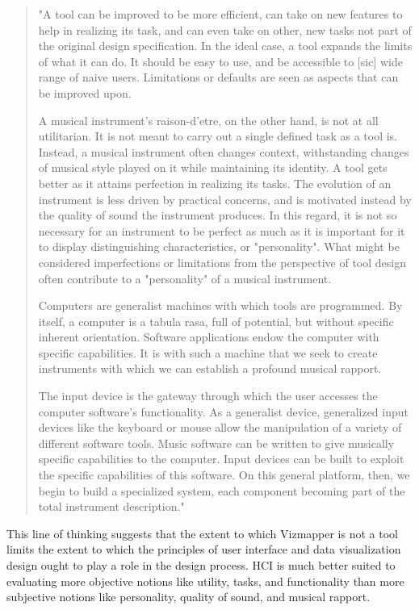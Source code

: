 \begin{quote}
"A tool can be improved to be more efficient, can take on new features to help in realizing its task, and can even take on other, new tasks not part of the original design specification. In the ideal case, a tool expands the limits of what it can do. It should be easy to use, and be accessible to [sic] wide range of naive users. Limitations or defaults are seen as aspects that can be improved upon.

A musical instrument's raison-d'etre, on the other hand, is not at all utilitarian. It is not meant to carry out a single defined task as a tool is. Instead, a musical instrument often changes context, withstanding changes of musical style played on it while maintaining its identity. A tool gets better as it attains perfection in realizing its tasks. The evolution of an instrument is less driven by practical concerns, and is motivated instead by the quality of sound the instrument produces. In this regard, it is not so necessary for an instrument to be perfect as much as it is important for it to display distinguishing characteristics, or "personality". What might be considered imperfections or limitations from the perspective of tool design often contribute to a "personality" of a musical instrument.

Computers are generalist machines with which tools are programmed. By itself, a computer is a tabula rasa, full of potential, but without specific inherent orientation. Software applications endow the computer with specific capabilities. It is with such a machine that we seek to create instruments with which we can establish a profound musical rapport.

The input device is the gateway through which the user accesses the computer software's functionality. As a generalist device, generalized input devices like the keyboard or mouse allow the manipulation of a variety of different software tools. Music software can be written to give musically specific capabilities to the computer. Input devices can be built to exploit the specific capabilities of this software. On this general platform, then, we begin to build a specialized system, each component becoming part of the total instrument description." 
\end{quote}

This line of thinking suggests that the extent to which Vizmapper is not a tool limits the extent to which the principles of user interface and data visualization design ought to play a role in the design process. HCI is much better suited to evaluating more objective notions like utility, tasks, and functionality than more subjective notions like personality, quality of sound, and musical rapport.

